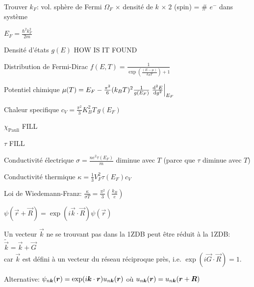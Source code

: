 \begin{squishlist}
    \item Trouver $k_F$: vol. sphère de Fermi $\Omega_F$ $\times$ densité de $k$ $\times \; 2$ (spin) = \# $e^-$ dans système 
    \item $E_F = \frac{\hbar^2 k_F^2}{2m}$
\end{squishlist}

\begin{squishlist}
    \item Densité d'états $g(E)$ HOW IS IT FOUND
    \item Distribution de Fermi-Dirac $f(E,T) = \frac{1}{\exp\left(\frac{(E- \mu)}{k_B T}\right) + 1}$
    \item Potentiel chimique $\mu(T) = E_F - \frac{\pi^2}{6}(k_B T)^2 \frac{1}{g(E_F)} \left.\dder{g}{E}\right|_{E_F}$
    \item Chaleur specifique $c_V = \frac{\pi^2}{3}K_B^2 T \, g(E_F) $
    \item $\chi_{\text{Pauli}}$ FILL
    \item $\tau$ FILL
    \item Conductivité électrique $\sigma = \frac{n e^2 \tau(E_F)}{m}$ diminue avec $T$ (parce que $\tau$ diminue avec $T$)
    \item Conductivité thermique $\kappa = \frac{1}{3}V_F^2 \tau(E_F) c_V$
    \item Loi de Wiedemann-Franz: $\frac{\kappa}{\sigma T} = \frac{\pi^2}{3}\left(\frac{k_B}{e}\right)$
\end{squishlist}

\begin{squishlist}
    \item $\psi(\vec{r} + \vec{R}) = \exp(i\vec{k} \cdot \vec{R}) \psi(\vec{r})$
    \item Un vecteur $\vec{k}$ ne se trouvant pas dans la 1ZDB peut être réduit à la 1ZDB: $\tilde{\vec{k}} = \vec{k} + \vec{G}$ \\
    car $\vec{k}$ est défini à un vecteur du réseau réciproque près, i.e. $\exp(i \vec{G}\cdot \vec{R}) = 1$.
    \item Alternative: $\psi_{n \vec{k}}(\vr) = \exp(i \vk \cdot \vr ) u_{n \vk}(\vr)$ où $u_{n \vk}(\vr) =  u_{n \vk}(\vr+ \vR)$
\end{squishlist}

